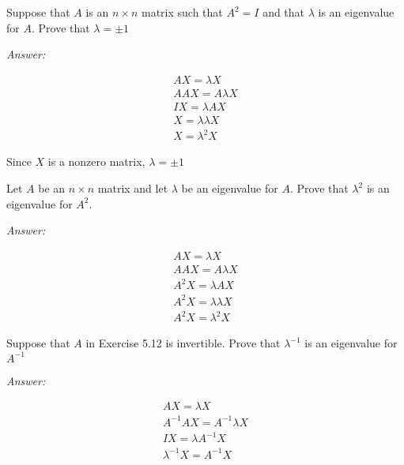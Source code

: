 \documentclass[letterpaper]{article}
\newcommand{\ans}{\textit{Answer: }}
\newenvironment{question}[2][Question]{\begin{trivlist}
\item[\hskip \labelsep {\bfseries #1}\hskip \labelsep {\bfseries #2.}]}{\end{trivlist}}
\begin{document}
\begin{question}{5.11}
  Suppose that $A$ is an $n \times n$ matrix such that $A^{2}=I$ and that $\lambda$ is an eigenvalue for $A .$ Prove that $\lambda=\pm 1$

  \ans 

  \begin{gather*}
    AX = \lambda X \\
    AAX = A \lambda X \\
    IX = \lambda AX \\
    X = \lambda \lambda X \\
    X = \lambda^2 X 
  \end{gather*}
  
  Since $X$ is a nonzero matrix, $\lambda = \pm 1$

\end{question}

\begin{question}{5.12}
  Let $A$ be an $n \times n$ matrix and let $\lambda$ be an eigenvalue for $A .$ Prove that $\lambda^{2}$ is an eigenvalue for $A^{2} . $

  \ans

  \begin{gather*}
    AX = \lambda X \\
    AAX = A \lambda X \\
    A^2X = \lambda AX \\
    A^2X = \lambda \lambda X \\
    A^2X = \lambda^2 X
  \end{gather*}
  
\end{question}

\begin{question}{5.13}
  Suppose that $A$ in Exercise 5.12 is invertible. Prove that $\lambda^{-1}$ is an eigenvalue
  for $A^{-1}$

  \ans

  \begin{gather*}
    AX = \lambda X \\
    A^{-1}AX = A^{-1}\lambda X \\
    IX = \lambda A^{-1}X \\
    \lambda^{-1} X = A^{-1}X \\
  \end{gather*}
  
\end{question}
\end{document}
